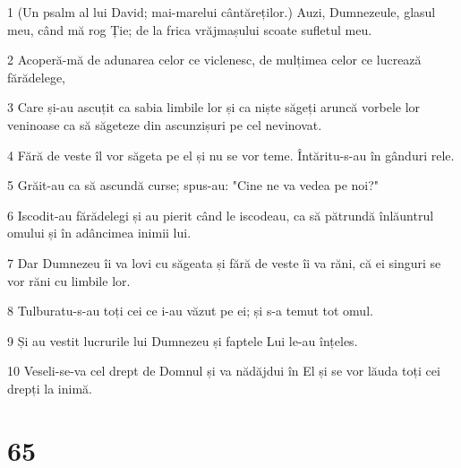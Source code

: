 \par 1 (Un psalm al lui David; mai-marelui cântăreților.) Auzi, Dumnezeule, glasul meu, când mă rog Ție; de la frica vrăjmașului scoate sufletul meu.
\par 2 Acoperă-mă de adunarea celor ce viclenesc, de mulțimea celor ce lucrează fărădelege,
\par 3 Care și-au ascuțit ca sabia limbile lor și ca niște săgeți aruncă vorbele lor veninoase ca să săgeteze din ascunzișuri pe cel nevinovat.
\par 4 Fără de veste îl vor săgeta pe el și nu se vor teme. Întăritu-s-au în gânduri rele.
\par 5 Grăit-au ca să ascundă curse; spus-au: "Cine ne va vedea pe noi?"
\par 6 Iscodit-au fărădelegi și au pierit când le iscodeau, ca să pătrundă înlăuntrul omului și în adâncimea inimii lui.
\par 7 Dar Dumnezeu îi va lovi cu săgeata și fără de veste îi va răni, că ei singuri se vor răni cu limbile lor.
\par 8 Tulburatu-s-au toți cei ce i-au văzut pe ei; și s-a temut tot omul.
\par 9 Și au vestit lucrurile lui Dumnezeu și faptele Lui le-au înțeles.
\par 10 Veseli-se-va cel drept de Domnul și va nădăjdui în El și se vor lăuda toți cei drepți la inimă.

\chapter{65}


